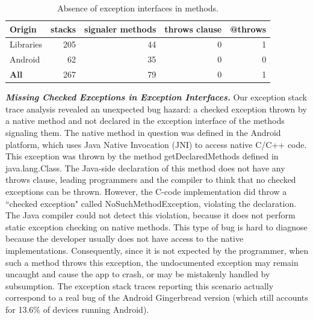 \bigskip


\bigskip

\begin{table}
\scriptsize
\centering

\begin{tabular}{lrrrr}
    \hline
 \bfseries{Origin}   &  \bfseries{stacks}  & \bfseries{signaler methods} &  \bfseries{throws clause}  &  \bfseries{@throws}  \\
\hline
Libraries	& 	205	 & 	44	& 0	& 1	\\
Android  	&	62 &	35	&0 &  0	\\
\hline
\bfseries{All}	&	267 &	79 &  0  & 1\\
\hline
  \end{tabular}
\caption{Absence of exception interfaces in methods.}
\label{tab:runtimeinterface}
\end{table}

\emph{\textbf{Missing Checked Exceptions in Exception Interfaces.}}
Our exception stack trace analysis revealed an unexpected bug hazard: a
checked exception thrown by a native method and not declared in the exception
interface of the methods signaling them. The native method in question was defined in
 the Android platform, which uses Java Native Invocation (JNI) to access
native C/C++ code. This exception was thrown by the method getDeclaredMethods defined in java.lang.Class.
The Java-side declaration of this method does not have any throws clause,
leading programmers and the compiler to think that no checked exceptions can be thrown.
 However, the C-code implementation did throw a ``checked exception" called NoSuchMethodException,
violating the declaration. The Java compiler could not detect this violation, because it does
not perform static exception checking on native methods. This type of bug is hard to diagnose
because the developer usually does not have access to the native implementations.
Consequently, since it is not expected by the programmer, when such a method throws
this exception, the undocumented exception may remain
uncaught and cause the app to crash, or may be mistakenly handled by subsumption.
The exception stack traces reporting this scenario actually correspond
to a real bug of the Android
Gingerbread version (which still accounts for 13.6\% of devices running Android).


